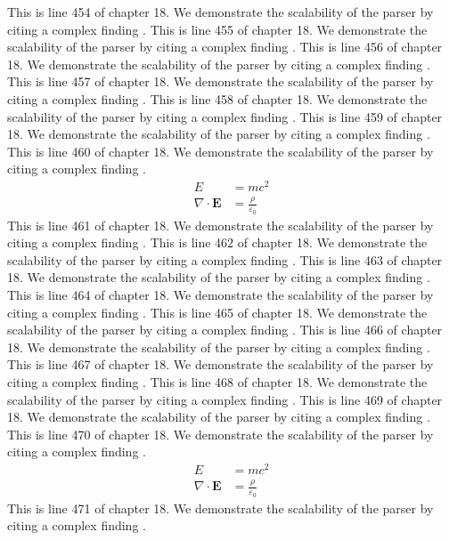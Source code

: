 This is line 454 of chapter 18. We demonstrate the scalability of the parser by citing a complex finding \cite{ref18_454}.
This is line 455 of chapter 18. We demonstrate the scalability of the parser by citing a complex finding \cite{ref18_455}.
This is line 456 of chapter 18. We demonstrate the scalability of the parser by citing a complex finding \cite{ref18_456}.
This is line 457 of chapter 18. We demonstrate the scalability of the parser by citing a complex finding \cite{ref18_457}.
This is line 458 of chapter 18. We demonstrate the scalability of the parser by citing a complex finding \cite{ref18_458}.
This is line 459 of chapter 18. We demonstrate the scalability of the parser by citing a complex finding \cite{ref18_459}.
This is line 460 of chapter 18. We demonstrate the scalability of the parser by citing a complex finding \cite{ref18_460}.
\begin{align*}
  E &= mc^2 \\
  \nabla \cdot \mathbf{E} &= \frac{\rho}{\varepsilon_0}
\end{align*}
This is line 461 of chapter 18. We demonstrate the scalability of the parser by citing a complex finding \cite{ref18_461}.
This is line 462 of chapter 18. We demonstrate the scalability of the parser by citing a complex finding \cite{ref18_462}.
This is line 463 of chapter 18. We demonstrate the scalability of the parser by citing a complex finding \cite{ref18_463}.
This is line 464 of chapter 18. We demonstrate the scalability of the parser by citing a complex finding \cite{ref18_464}.
This is line 465 of chapter 18. We demonstrate the scalability of the parser by citing a complex finding \cite{ref18_465}.
This is line 466 of chapter 18. We demonstrate the scalability of the parser by citing a complex finding \cite{ref18_466}.
This is line 467 of chapter 18. We demonstrate the scalability of the parser by citing a complex finding \cite{ref18_467}.
This is line 468 of chapter 18. We demonstrate the scalability of the parser by citing a complex finding \cite{ref18_468}.
This is line 469 of chapter 18. We demonstrate the scalability of the parser by citing a complex finding \cite{ref18_469}.
This is line 470 of chapter 18. We demonstrate the scalability of the parser by citing a complex finding \cite{ref18_470}.
\begin{align*}
  E &= mc^2 \\
  \nabla \cdot \mathbf{E} &= \frac{\rho}{\varepsilon_0}
\end{align*}
This is line 471 of chapter 18. We demonstrate the scalability of the parser by citing a complex finding \cite{ref18_471}.
